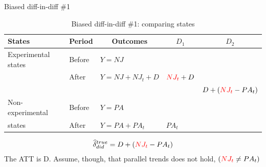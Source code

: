 \documentclass{beamer}
\begin{document}
\begin{frame}{Biased diff-in-diff \#1}

\begin{table}\centering
\scriptsize
		\caption{Biased diff-in-diff \#1: comparing states}
		\begin{center}
		\begin{tabular}{lll|lc}
		\toprule
		\multicolumn{1}{l}{\textbf{States}}&
		\multicolumn{1}{c}{\textbf{Period}}&
		\multicolumn{1}{c}{\textbf{Outcomes}}&
		\multicolumn{1}{c}{$D_1$}&
		\multicolumn{1}{c}{$D_2$}\\
		\midrule
		Experimental states & Before & $Y=NJ$ \\
		& After & $Y=NJ + NJ_t + D$ & $\textcolor{red}{NJ_t}+D$\\
		\midrule
		& & & & $D + (\textcolor{red}{NJ_t}- PA_t)$ \\
		\midrule
		Non-experimental  & Before & $Y=PA$ \\
		states& After & $Y=PA + PA_t$ & $PA_t$\\
		\bottomrule
		\end{tabular}
		\end{center}
	\end{table}

\begin{eqnarray*}
\widehat{\delta}^{true}_{did} = D + (\textcolor{red}{NJ_t}- PA_t)
\end{eqnarray*}The ATT is D. Assume, though, that parallel trends does not hold, $(\textcolor{red}{NJ_t} \neq PA_t)$

\end{frame}
\end{document}
